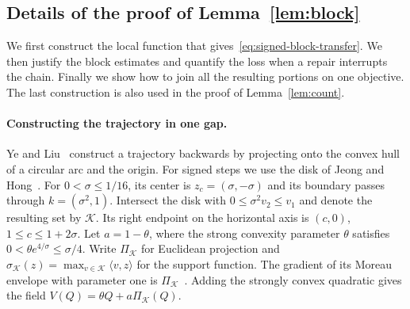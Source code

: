\documentclass[11pt]{article}
\theoremstyle{definition}
\begin{document}
\subsection{Details of the proof of Lemma~\ref{lem:block}}\label{app:arc}

We first construct the local function that gives~\eqref{eq:signed-block-transfer}. We then justify the block estimates and quantify the loss when a repair interrupts the chain. Finally we show how to join all the resulting portions on one objective. The last construction is also used in the proof of Lemma~\ref{lem:count}.

\paragraph{Constructing the trajectory in one gap.}
Ye and Liu~\cite[Section~3.1]{YLsmooth} construct a trajectory backwards by
projecting onto the convex hull of a circular arc and the origin. For signed
steps we use the disk of Jeong and Hong~\cite[Section~4.2]{JH}. For \(0<\sigma\le1/16\),
its center is \(z_c=(\sigma,-\sigma)\) and its boundary passes through
\(k=(\sigma^2,1)\). Intersect the disk with \(0\le\sigma^2 v_2\le v_1\)
and denote the resulting set by \(\mathcal K\). Its right endpoint on the
horizontal axis is \((c,0)\), \(1\le c\le1+2\sigma\). Let \(a=1-\theta\),
where the strong convexity parameter \(\theta\) satisfies \(0<\theta e^{4/\sigma}\le\sigma/4\). Write \(\Pi_{\mathcal K}\) for
Euclidean projection and \(\sigma_{\mathcal K}(z)=\max_{v\in\mathcal K}
\langle v,z\rangle\) for the support function. The gradient of its
Moreau envelope with parameter one is \(\Pi_{\mathcal K}\)~\cite[(4.12)]{JH}.
Adding the strongly convex quadratic gives the field
\(V(Q)=\theta Q+a\Pi_{\mathcal K}(Q)\).
\end{document}
